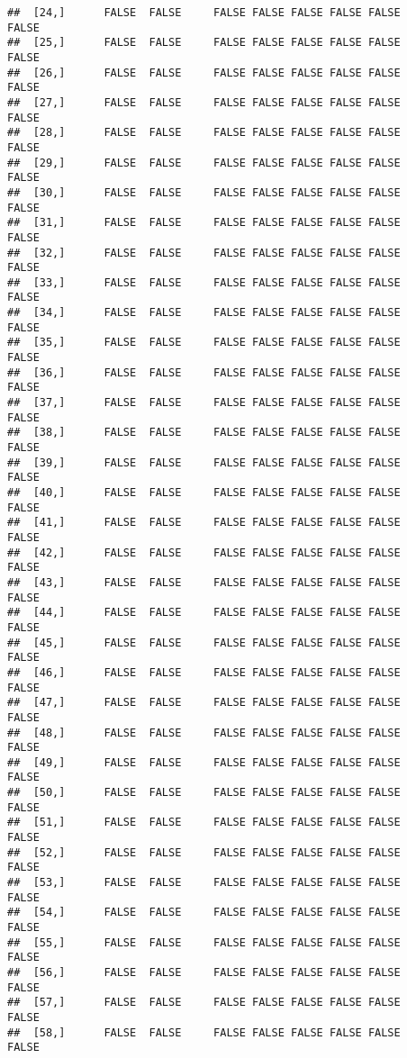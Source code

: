 \documentclass[
]{article}
\begin{document}
\begin{verbatim}
##  [24,]      FALSE  FALSE     FALSE FALSE FALSE FALSE FALSE         FALSE
##  [25,]      FALSE  FALSE     FALSE FALSE FALSE FALSE FALSE         FALSE
##  [26,]      FALSE  FALSE     FALSE FALSE FALSE FALSE FALSE         FALSE
##  [27,]      FALSE  FALSE     FALSE FALSE FALSE FALSE FALSE         FALSE
##  [28,]      FALSE  FALSE     FALSE FALSE FALSE FALSE FALSE         FALSE
##  [29,]      FALSE  FALSE     FALSE FALSE FALSE FALSE FALSE         FALSE
##  [30,]      FALSE  FALSE     FALSE FALSE FALSE FALSE FALSE         FALSE
##  [31,]      FALSE  FALSE     FALSE FALSE FALSE FALSE FALSE         FALSE
##  [32,]      FALSE  FALSE     FALSE FALSE FALSE FALSE FALSE         FALSE
##  [33,]      FALSE  FALSE     FALSE FALSE FALSE FALSE FALSE         FALSE
##  [34,]      FALSE  FALSE     FALSE FALSE FALSE FALSE FALSE         FALSE
##  [35,]      FALSE  FALSE     FALSE FALSE FALSE FALSE FALSE         FALSE
##  [36,]      FALSE  FALSE     FALSE FALSE FALSE FALSE FALSE         FALSE
##  [37,]      FALSE  FALSE     FALSE FALSE FALSE FALSE FALSE         FALSE
##  [38,]      FALSE  FALSE     FALSE FALSE FALSE FALSE FALSE         FALSE
##  [39,]      FALSE  FALSE     FALSE FALSE FALSE FALSE FALSE         FALSE
##  [40,]      FALSE  FALSE     FALSE FALSE FALSE FALSE FALSE         FALSE
##  [41,]      FALSE  FALSE     FALSE FALSE FALSE FALSE FALSE         FALSE
##  [42,]      FALSE  FALSE     FALSE FALSE FALSE FALSE FALSE         FALSE
##  [43,]      FALSE  FALSE     FALSE FALSE FALSE FALSE FALSE         FALSE
##  [44,]      FALSE  FALSE     FALSE FALSE FALSE FALSE FALSE         FALSE
##  [45,]      FALSE  FALSE     FALSE FALSE FALSE FALSE FALSE         FALSE
##  [46,]      FALSE  FALSE     FALSE FALSE FALSE FALSE FALSE         FALSE
##  [47,]      FALSE  FALSE     FALSE FALSE FALSE FALSE FALSE         FALSE
##  [48,]      FALSE  FALSE     FALSE FALSE FALSE FALSE FALSE         FALSE
##  [49,]      FALSE  FALSE     FALSE FALSE FALSE FALSE FALSE         FALSE
##  [50,]      FALSE  FALSE     FALSE FALSE FALSE FALSE FALSE         FALSE
##  [51,]      FALSE  FALSE     FALSE FALSE FALSE FALSE FALSE         FALSE
##  [52,]      FALSE  FALSE     FALSE FALSE FALSE FALSE FALSE         FALSE
##  [53,]      FALSE  FALSE     FALSE FALSE FALSE FALSE FALSE         FALSE
##  [54,]      FALSE  FALSE     FALSE FALSE FALSE FALSE FALSE         FALSE
##  [55,]      FALSE  FALSE     FALSE FALSE FALSE FALSE FALSE         FALSE
##  [56,]      FALSE  FALSE     FALSE FALSE FALSE FALSE FALSE         FALSE
##  [57,]      FALSE  FALSE     FALSE FALSE FALSE FALSE FALSE         FALSE
##  [58,]      FALSE  FALSE     FALSE FALSE FALSE FALSE FALSE         FALSE

\end{verbatim}
\end{document}
